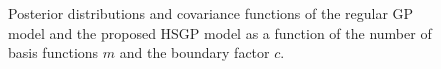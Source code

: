 \documentclass[]{interact}
\theoremstyle{plain}%
\theoremstyle{definition}
\theoremstyle{remark}
\begin{document}
\begin{figure}
\centering
{}
\caption{Posterior distributions and covariance functions of the regular GP model and the proposed HSGP model as a function of the number of basis functions $m$ and the boundary factor $c$.} 
  \label{fig4_Post_&_Cov_part1}
\end{figure}
\end{document}
